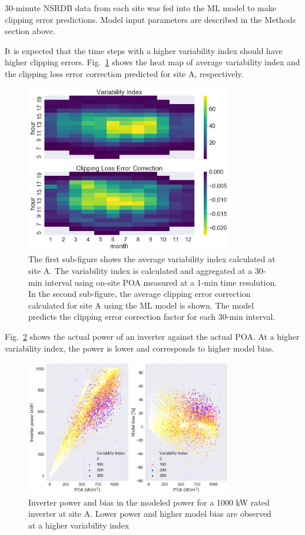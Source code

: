 \documentclass[conference]{IEEEtran}
\begin{document}
30-minute NSRDB data from each site was fed into the ML model to make clipping error predictions. Model input parameters are described in the Methods section above.

It is expected that the time steps with a higher variability index should have higher clipping errors. Fig.~\ref{fig:DCS-vi-clec-heatmap} shows the heat map of average variability index and the clipping loss error correction predicted for site A, respectively.

\begin{figure}[htbp]
\centerline{\includegraphics[width=9cm]{DCS_VI_CLEC_heatmap.png}}
\caption{The first sub-figure shows the average variability index calculated at site A. The variability index is calculated and aggregated at a 30-min interval using on-site POA measured at a 1-min time resolution. In the second sub-figure, the average clipping error correction calculated for site A using the ML model is shown. The model predicts the clipping error correction factor for each 30-min interval.}
\label{fig:DCS-vi-clec-heatmap}
\end{figure}

Fig.~\ref{fig:DCS-inv-modelbias-poa-scatter} shows the actual power of an inverter against the actual POA. At a higher variability index, the power is lower and corresponds to higher model bias.

\begin{figure}[htbp]
\centerline{\includegraphics[width=9cm]{DCS_Inv_ModelBias_POA_with_VI.png}}
\caption{Inverter power and bias in the modeled power for a 1000 kW rated inverter at site A. Lower power and higher model bias are observed at a higher variability index}
\label{fig:DCS-inv-modelbias-poa-scatter}
\end{figure}
\end{document}

